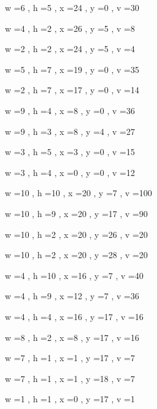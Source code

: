 \documentclass[11pt]{article}
\begin{document}
w =6 , h =5 , x =24 , y =0 , v =30
\par
w =4 , h =2 , x =26 , y =5 , v =8
\par
w =2 , h =2 , x =24 , y =5 , v =4
\par
w =5 , h =7 , x =19 , y =0 , v =35
\par
w =2 , h =7 , x =17 , y =0 , v =14
\par
w =9 , h =4 , x =8 , y =0 , v =36
\par
w =9 , h =3 , x =8 , y =4 , v =27
\par
w =3 , h =5 , x =3 , y =0 , v =15
\par
w =3 , h =4 , x =0 , y =0 , v =12
\par
w =10 , h =10 , x =20 , y =7 , v =100
\par
w =10 , h =9 , x =20 , y =17 , v =90
\par
w =10 , h =2 , x =20 , y =26 , v =20
\par
w =10 , h =2 , x =20 , y =28 , v =20
\par
w =4 , h =10 , x =16 , y =7 , v =40
\par
w =4 , h =9 , x =12 , y =7 , v =36
\par
w =4 , h =4 , x =16 , y =17 , v =16
\par
w =8 , h =2 , x =8 , y =17 , v =16
\par
w =7 , h =1 , x =1 , y =17 , v =7
\par
w =7 , h =1 , x =1 , y =18 , v =7
\par
w =1 , h =1 , x =0 , y =17 , v =1
\par
\newpage
\end{document}
